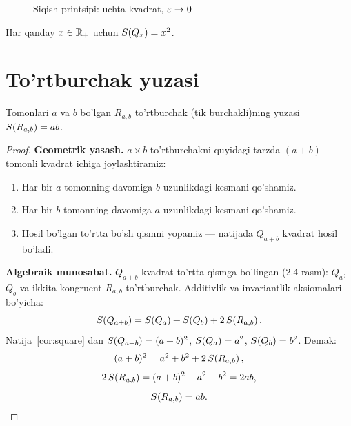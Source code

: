 \begin{figure}[h]
\centering
{}
\caption{Siqish printsipi: uchta kvadrat, $\varepsilon\to 0$}
\label{fig:sq_real}
\end{figure}

\begin{natija}
\label{cor:square}
Har qanday $x\in\mathbb{R}_{+}$ uchun $S\!\left(Q_x\right) = x^2$.
\end{natija}

\section{To'rtburchak yuzasi}
\label{sec:rect}

\begin{teorema}
\label{thm:rect}
Tomonlari $a$ va $b$ bo'lgan $R_{a,b}$ to'rtburchak (tik burchakli)ning yuzasi
$S\!\left(R_{a,b}\right) = ab$.
\end{teorema}
\begin{proof}
\textbf{Geometrik yasash.}
$a\times b$ to'rtburchakni quyidagi tarzda $(a+b)$ tomonli kvadrat ichiga joylashtiramiz:
\begin{enumerate}[leftmargin=*, label=\textit{Qadam \arabic*}.]
  \item Har bir $a$ tomonning davomiga $b$ uzunlikdagi kesmani qo'shamiz.
  \item Har bir $b$ tomonning davomiga $a$ uzunlikdagi kesmani qo'shamiz.
  \item Hosil bo'lgan to'rtta bo'sh qismni yopamiz — natijada $Q_{a+b}$
        kvadrat hosil bo'ladi.
\end{enumerate}

\textbf{Algebraik munosabat.} $Q_{a+b}$ kvadrat to'rtta qismga bo'lingan
(2.4-rasm): $Q_a$, $Q_b$ va ikkita kongruent $R_{a,b}$ to'rtburchak.
Additivlik va invariantlik aksiomalari bo'yicha:
\[
  S\!\left(Q_{a+b}\right) = S\!\left(Q_a\right) + S\!\left(Q_b\right) + 2\,S\!\left(R_{a,b}\right).
\]
Natija~\ref{cor:square} dan $S\!\left(Q_{a+b}\right) = (a+b)^2$, $S\!\left(Q_a\right)=a^2$,
$S\!\left(Q_b\right)=b^2$. Demak:
\[
  (a+b)^2 = a^2 + b^2 + 2\,S\!\left(R_{a,b}\right),
\]
\[
  2\,S\!\left(R_{a,b}\right) = (a+b)^2 - a^2 - b^2 = 2ab,
\]
\[
  S\!\left(R_{a,b}\right) = ab. \qedhere
\]
\end{proof}

